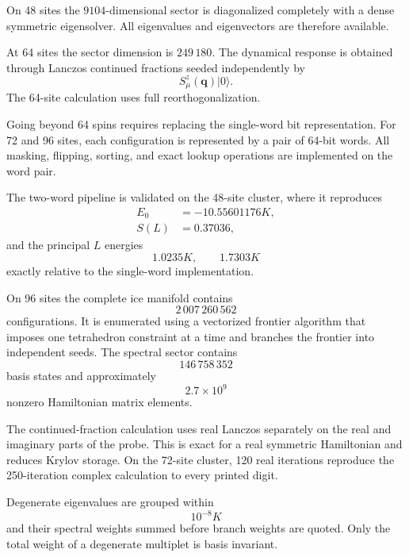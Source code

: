 \documentclass[
aps,
prl,
onecolumn,
amsmath,
amssymb,
superscriptaddress,
longbibliography
]{revtex4-2}
\newcommand{\bq}{\bm q}
\begin{document}
On 48 sites the $9104$-dimensional sector is diagonalized completely
with a dense symmetric eigensolver.
All eigenvalues and eigenvectors are therefore available.

At 64 sites the sector dimension is $249\,180$.
The dynamical response is obtained through Lanczos continued
fractions seeded independently by
\begin{equation}
S_\mu^z(\bq)|0\rangle .
\end{equation}
The 64-site calculation uses full reorthogonalization.

Going beyond 64 spins requires replacing the single-word bit
representation.
For 72 and 96 sites, each configuration is represented by a pair of
64-bit words.
All masking, flipping, sorting, and exact lookup operations are
implemented on the word pair.

The two-word pipeline is validated on the 48-site cluster, where it
reproduces
\begin{align}
E_0&=-10.55601176K,\\
S(L)&=0.37036,
\end{align}
and the principal $L$ energies
\begin{equation}
1.0235K,\qquad1.7303K
\end{equation}
exactly relative to the single-word implementation.

On 96 sites the complete ice manifold contains
\begin{equation}
2\,007\,260\,562
\end{equation}
configurations.
It is enumerated using a vectorized frontier algorithm that imposes
one tetrahedron constraint at a time and branches the frontier into
independent seeds.
The spectral sector contains
\begin{equation}
146\,758\,352
\end{equation}
basis states and approximately
\begin{equation}
2.7\times10^9
\end{equation}
nonzero Hamiltonian matrix elements.

The continued-fraction calculation uses real Lanczos separately on
the real and imaginary parts of the probe.
This is exact for a real symmetric Hamiltonian and reduces Krylov
storage.
On the 72-site cluster, 120 real iterations reproduce the
250-iteration complex calculation to every printed digit.

Degenerate eigenvalues are grouped within
\begin{equation}
10^{-8}K
\end{equation}
and their spectral weights summed before branch weights are quoted.
Only the total weight of a degenerate multiplet is basis invariant.
\end{document}
